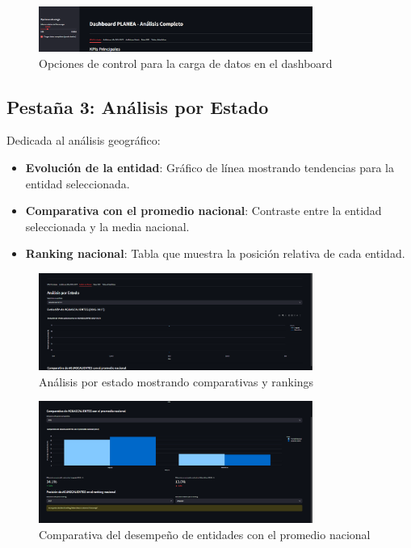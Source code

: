 \begin{figure}[h]
    \centering
    \includegraphics[width=0.8\textwidth]{../imagenes/opciones de carga.png}
    \caption{Opciones de control para la carga de datos en el dashboard}
    \label{fig:opciones_carga}
\end{figure}

\subsection{Pestaña 3: Análisis por Estado}
Dedicada al análisis geográfico:

\begin{itemize}
    \item \textbf{Evolución de la entidad}: Gráfico de línea mostrando tendencias para la entidad seleccionada.
    
    \item \textbf{Comparativa con el promedio nacional}: Contraste entre la entidad seleccionada y la media nacional.
    
    \item \textbf{Ranking nacional}: Tabla que muestra la posición relativa de cada entidad.
\end{itemize}

\begin{figure}[h]
    \centering
    \includegraphics[width=0.8\textwidth]{../imagenes/ananlisis por estado .png}
    \caption{Análisis por estado mostrando comparativas y rankings}
    \label{fig:analisis_estado}
\end{figure}

\begin{figure}[h]
    \centering
    \includegraphics[width=0.8\textwidth]{../imagenes/comparativa con promedio nacioanal.png}
    \caption{Comparativa del desempeño de entidades con el promedio nacional}
    \label{fig:comparativa_nacional}
\end{figure}

